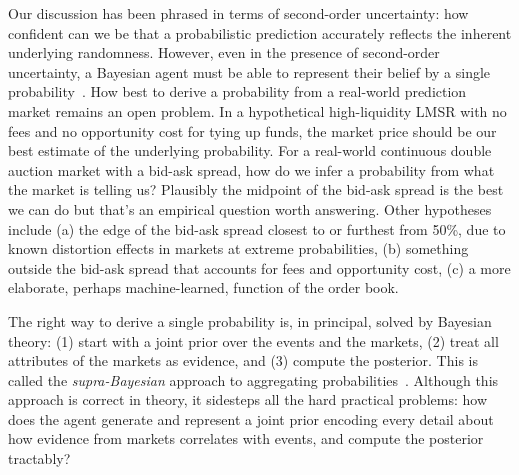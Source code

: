 \documentclass[sigconf,anonymous]{aamas}   %
\newcommand{\rupert}[1]{\ifnum\Chatty=1 \textcolor{red}   {Rupert: [#1]} \fi}
\begin{document}
Our discussion has been phrased in terms of second-order uncertainty: how confident can we be that a probabilistic prediction accurately reflects the inherent underlying randomness. However, even in the presence of second-order uncertainty, a Bayesian agent must be able to represent their belief by a single probability~\cite{pearl1987}. 
How best to derive a probability from a real-world prediction market remains an open problem.
In a hypothetical high-liquidity LMSR with no fees and no opportunity cost for tying up funds, the market price should be our best estimate of the underlying probability.
For a real-world continuous double auction market with a bid-ask spread, how do we infer a probability from what the market is telling us?
Plausibly the midpoint of the bid-ask spread is the best we can do but that's an empirical question worth answering.
Other hypotheses include (a) the edge of the bid-ask spread closest to or furthest from 50\%, due to known distortion effects in markets at extreme probabilities, (b) something outside the bid-ask spread that accounts for fees and opportunity cost, (c) a more elaborate, perhaps machine-learned, function of the order book.

The right way to derive a single probability is, in principal, solved by Bayesian theory: (1) start with a joint prior over the events and the markets, (2) treat all attributes of the markets as evidence, and (3) compute the posterior. This is called the \emph{supra-Bayesian} approach to aggregating probabilities~\cite{winkler1968, morris1974, morris1977,Lindley85,Lindley88}. Although this approach is correct in theory, it sidesteps all the hard practical problems: how does the agent generate and represent a joint prior encoding every detail about how evidence from markets correlates with events, and compute the posterior tractably?



 

\end{document}
